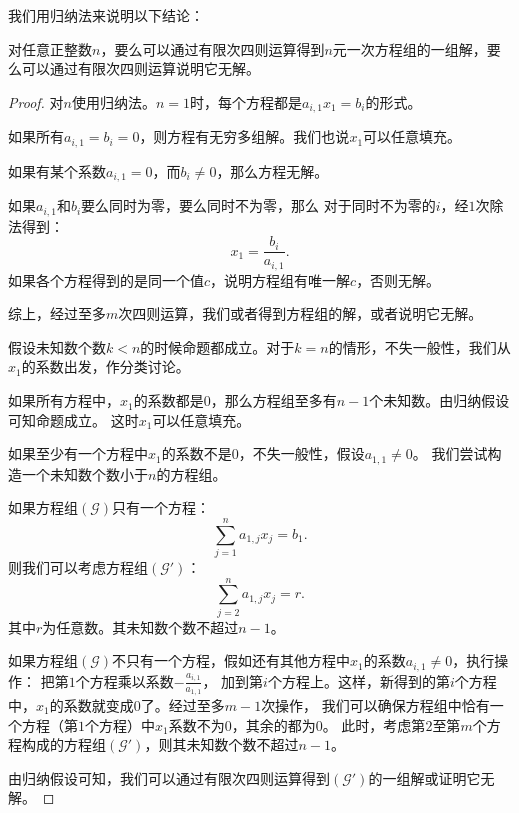 \documentclass[12pt,UTF8,fontset=none]{ctexbook}
\begin{document}
我们用归纳法来说明以下结论：
\begin{tm}
    对任意正整数$n$，要么可以通过有限次四则运算得到$n$元一次方程组的一组解，要么可以通过有限次四则运算说明它无解。
\end{tm}

\begin{proof}
    对$n$使用归纳法。$n=1$时，每个方程都是$a_{i,1} x_1 = b_i$的形式。

    如果所有$a_{i,1} = b_i = 0$，则方程有无穷多组解。我们也说$x_1$可以任意填充。
    
    如果有某个系数$a_{i,1} = 0$，而$b_i\neq 0$，那么方程无解。

    如果$a_{i,1}$和$b_i$要么同时为零，要么同时不为零，那么
    对于同时不为零的$i$，经$1$次除法得到：
    $$ x_1 = \frac{b_i}{a_{i,1}}. $$
    如果各个方程得到的是同一个值$c$，说明方程组有唯一解$c$，否则无解。

    综上，经过至多$m$次四则运算，我们或者得到方程组的解，或者说明它无解。

    假设未知数个数$k<n$的时候命题都成立。对于$k=n$的情形，不失一般性，我们从$x_1$的系数出发，作分类讨论。

    如果所有方程中，$x_1$的系数都是$0$，那么方程组至多有$n-1$个未知数。由归纳假设可知命题成立。
    这时$x_1$可以任意填充。

    如果至少有一个方程中$x_1$的系数不是$0$，不失一般性，假设$a_{1,1} \neq 0$。
    我们尝试构造一个未知数个数小于$n$的方程组。

    如果方程组$(\mathcal{G})$只有一个方程：
    $$ \sum_{j=1}^n a_{1,j} x_j = b_{1}. $$
    则我们可以考虑方程组$(\mathcal{G}')$：
    $$ \sum_{j=2}^n a_{1,j} x_j = r. $$
    其中$r$为任意数。其未知数个数不超过$n-1$。



    如果方程组$(\mathcal{G})$不只有一个方程，假如还有其他方程中$x_1$的系数$a_{i,1} \neq 0$，执行操作：
    把第$1$个方程乘以系数$-\frac{a_{i,1}}{a_{1,1}}$，
    加到第$i$个方程上。这样，新得到的第$i$个方程中，$x_1$的系数就变成$0$了。经过至多$m-1$次操作，
    我们可以确保方程组中恰有一个方程（第$1$个方程）中$x_1$系数不为$0$，其余的都为$0$。
    此时，考虑第$2$至第$m$个方程构成的方程组$(\mathcal{G}')$，则其未知数个数不超过$n-1$。

    由归纳假设可知，我们可以通过有限次四则运算得到$(\mathcal{G}')$的一组解或证明它无解。


\end{proof}
\end{document}
